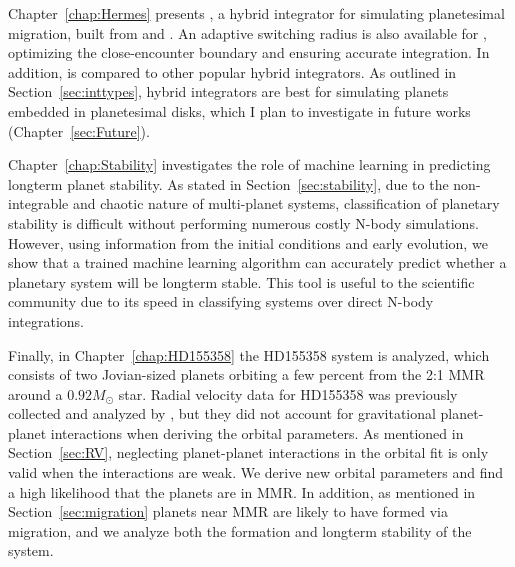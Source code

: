 Chapter~\ref{chap:Hermes} presents \hermes, a hybrid integrator for simulating planetesimal migration, built from \ias \citep{Rein2015a} and \whfast \citep{Rein2015b}. 
An adaptive switching radius is also available for \hermes, optimizing the close-encounter boundary and ensuring accurate integration.
In addition, \hermes is compared to other popular hybrid integrators. 
As outlined in Section~\ref{sec:inttypes}, hybrid integrators are best for simulating planets embedded in planetesimal disks, which I plan to investigate in future works (Chapter~\ref{sec:Future}). 

Chapter~\ref{chap:Stability} investigates the role of machine learning in predicting longterm planet stability. 
As stated in Section~\ref{sec:stability}, due to the non-integrable and chaotic nature of multi-planet systems, classification of planetary stability is difficult without performing numerous costly N-body simulations. 
However, using information from the initial conditions and early evolution, we show that a trained machine learning algorithm can accurately predict whether a planetary system will be longterm stable.  
This tool is useful to the scientific community due to its speed in classifying systems over direct N-body integrations.  

Finally, in Chapter~\ref{chap:HD155358} the HD155358 system is analyzed, which consists of two Jovian-sized planets orbiting a few percent from the 2:1 MMR around a $0.92M_{\odot}$ star. 
Radial velocity data for HD155358 was previously collected and analyzed by \citet{Robertson2012}, but they did not account for gravitational planet-planet interactions when deriving the orbital parameters.
As mentioned in Section~\ref{sec:RV}, neglecting planet-planet interactions in the orbital fit is only valid when the interactions are weak. 
We derive new orbital parameters and find a high likelihood that the planets are in MMR.
In addition, as mentioned in Section~\ref{sec:migration} planets near MMR are likely to have formed via migration, and we analyze both the formation and longterm stability of the system. 
